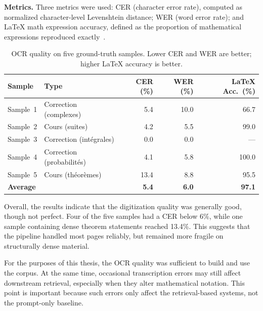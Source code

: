 \textbf{Metrics.} Three metrics were used: CER (character error rate),
computed as normalized character-level Levenshtein distance; WER (word error
rate); and \LaTeX{} math expression accuracy, defined as the proportion of
mathematical expressions reproduced exactly~\cite{wang2023ocrbench}.

\begin{table}[H]
\centering
\caption{OCR quality on five ground-truth samples. Lower CER and WER are better; higher \LaTeX{} accuracy is better.}
\label{tab:ocr-quality}
\begin{tabular}{llrrr}
\toprule
\textbf{Sample} & \textbf{Type} & \textbf{CER (\%)} & \textbf{WER (\%)} & \textbf{\LaTeX{} Acc.\ (\%)} \\
\midrule
Sample~1 & Correction (complexes)     & 5.4  & 10.0 & 66.7 \\
Sample~2 & Cours (suites)             & 4.2  & 5.5  & 99.0 \\
Sample~3 & Correction (intégrales)    & 0.0  & 0.0  & ---  \\
Sample~4 & Correction (probabilités)  & 4.1  & 5.8  & 100.0 \\
Sample~5 & Cours (théorèmes)          & 13.4 & 8.8  & 95.5 \\
\midrule
\textbf{Average} & & \textbf{5.4} & \textbf{6.0} & \textbf{97.1} \\
\bottomrule
\end{tabular}
\end{table}

Overall, the results indicate that the digitization quality was generally
good, though not perfect. Four of the five samples had a CER below 6\%,
while one sample containing dense theorem statements reached 13.4\%. This
suggests that the pipeline handled most pages reliably, but remained more
fragile on structurally dense material.

For the purposes of this thesis, the OCR quality was sufficient to build and
use the corpus. At the same time, occasional transcription errors may still
affect downstream retrieval, especially when they alter mathematical
notation. This point is important because such errors only affect the
retrieval-based systems, not the prompt-only baseline.









